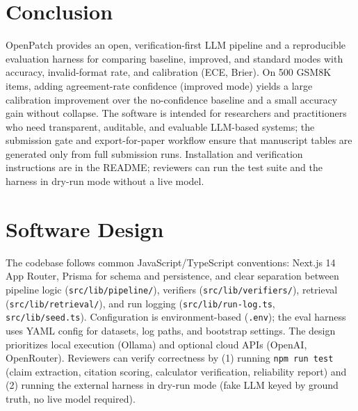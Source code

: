 \documentclass[10pt]{article}
\begin{document}
\section{Conclusion}
\label{sec:conclusion}
OpenPatch provides an open, verification-first LLM pipeline and a reproducible evaluation harness for comparing baseline, improved, and standard modes with accuracy, invalid-format rate, and calibration (ECE, Brier). On 500 GSM8K items, adding agreement-rate confidence (improved mode) yields a large calibration improvement over the no-confidence baseline and a small accuracy gain without collapse. The software is intended for researchers and practitioners who need transparent, auditable, and evaluable LLM-based systems; the submission gate and export-for-paper workflow ensure that manuscript tables are generated only from full submission runs. Installation and verification instructions are in the README; reviewers can run the test suite and the harness in dry-run mode without a live model.

\section{Software Design}
The codebase follows common JavaScript/TypeScript conventions: Next.js 14 App Router, Prisma for schema and persistence, and clear separation between pipeline logic (\texttt{src/lib/pipeline/}), verifiers (\texttt{src/lib/verifiers/}), retrieval (\texttt{src/lib/retrieval/}), and run logging (\texttt{src/lib/run-log.ts}, \texttt{src/lib/seed.ts}). Configuration is environment-based (\texttt{.env}); the eval harness uses YAML config for datasets, log paths, and bootstrap settings. The design prioritizes local execution (Ollama) and optional cloud APIs (OpenAI, OpenRouter). Reviewers can verify correctness by (1) running \texttt{npm run test} (claim extraction, citation scoring, calculator verification, reliability report) and (2) running the external harness in dry-run mode (fake LLM keyed by ground truth, no live model required).

\end{document}

